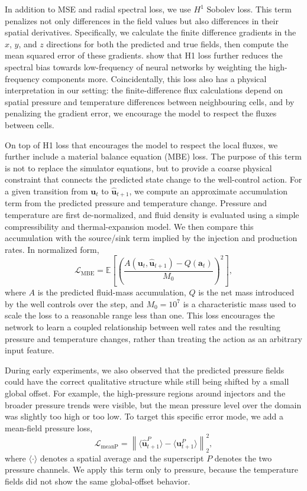 \documentclass[pdflatex,sn-mathphys-ay]{sn-jnl}
\newcommand{\svec}{\mathbf{u}}            %
\newcommand{\action}{\mathbf{a}}           %
\begin{document}
In addition to MSE and radial spectral loss, we use \(H^1\) Sobolev loss. This term
penalizes not only differences in the field values but also differences in their
spatial derivatives. Specifically, we calculate the finite difference
gradients in the \(x\), \(y\), and \(z\) directions for both the predicted and true fields,
then compute the mean squared error of these gradients. \cite{} show that H1 loss
further reduces the spectral bias towards low-frequency of neural networks by weighting
the high-frequency components more. Coincidentally, this loss also has a physical 
interpretation in our setting: the finite-difference flux
calculations depend on spatial pressure and temperature differences between neighbouring cells,
and by penalizing the gradient error, we encourage the model to respect 
the fluxes between cells.

On top of H1 loss that encourages the model to respect the local fluxes,
we further include a material balance equation (MBE) loss. The purpose of this
term is not to replace the simulator equations, but to provide a coarse physical
constraint that connects the predicted state change to the well-control action.
For a given transition from \(\svec_t\) to \(\hat{\svec}_{t+1}\), we compute an
approximate accumulation term from the predicted pressure and temperature change.
Pressure and temperature are first de-normalized, and fluid density is evaluated
using a simple compressibility and thermal-expansion model. We then compare this
accumulation with the source/sink term implied by the injection and production
rates. In normalized form,
\begin{equation}
  \mathcal{L}_{\mathrm{MBE}}
  =
  \mathbb{E}\!\left[
    \left(
      \frac{
        A(\svec_t,\hat{\svec}_{t+1}) - Q(\action_t)
      }{M_0}
    \right)^2
  \right],
  \label{eq:mbe-loss}
\end{equation}
where \(A\) is the predicted fluid-mass accumulation, \(Q\) is the net mass
introduced by the well controls over the step, and \(M_0=10^7\) is a
characteristic mass used to scale the loss to a reasonable range less
than one. This loss encourages the network to
learn a coupled relationship between well rates and the resulting pressure and
temperature changes, rather than treating the action as an arbitrary input
feature.

During early experiments, we also observed that the predicted pressure fields
could have the correct qualitative structure while still being shifted by a
small global offset. For example, the high-pressure regions around injectors and
the broader pressure trends were visible, but the mean pressure level over the
domain was slightly too high or too low. To target this specific error mode, we
add a mean-field pressure loss,
\begin{equation}
  \mathcal{L}_{\mathrm{meanP}}
  =
  \left\|
    \langle \hat{\svec}_{t+1}^{P} \rangle
    -
    \langle \svec_{t+1}^{P} \rangle
  \right\|_2^2,
  \label{eq:mean-pressure-loss}
\end{equation}
where \(\langle \cdot \rangle\) denotes a spatial average and the superscript
\(P\) denotes the two pressure channels. We apply this term only to pressure,
because the temperature fields did not show the same global-offset behavior.
\end{document}
